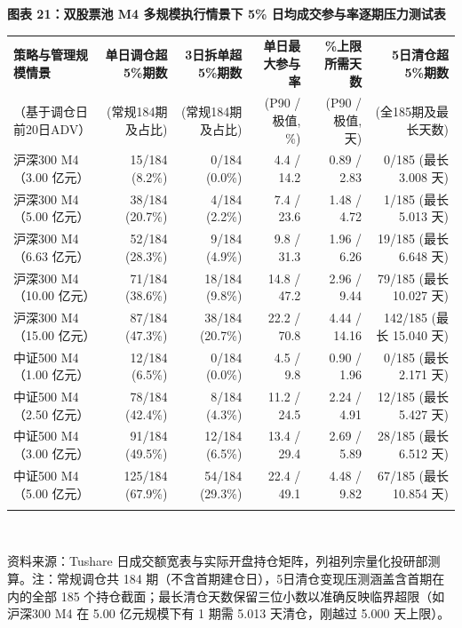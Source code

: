 \documentclass[12pt,a4paper]{article}
\newcommand{\exhibitcap}[1]{{\sffamily\bfseries\fontsize{9.6pt}{12.5pt}\selectfont\textcolor{Primary}{#1}}\\[2pt]}
\newcommand{\exhibitnote}[1]{{\fontsize{7.5pt}{10pt}\selectfont\color{GrayNote}#1\par}}
\begin{document}
\vspace{4pt}
\noindent\begin{minipage}{\textwidth}
\setlength{\parindent}{0pt}\setlength{\tabcolsep}{3.4pt}
\exhibitcap{图表 21：双股票池 M4 多规模执行情景下 5\% 日均成交参与率逐期压力测试表}
\fontsize{7.6pt}{10.3pt}\selectfont
\begin{tabularx}{\textwidth}{@{}X r r r r r@{}}
  \arrayrulecolor{Primary}\toprule[1.0pt]
  \rowcolor{TblHdr}
  \textbf{\sffamily 策略与管理规模情景} & \textbf{\sffamily 单日调仓超5\%期数} & \textbf{\sffamily 3日拆单超5\%期数} & \textbf{\sffamily 单日最大参与率} & \textbf{\sffamily 5\%上限所需天数} & \textbf{\sffamily 5日清仓超5\%期数} \\
  \rowcolor{TblHdr}
  {\fontsize{6.4}{7.8}\selectfont\textcolor{GrayNote}{（基于调仓日前20日ADV）}} &
  {\fontsize{6.4}{7.8}\selectfont\textcolor{GrayNote}{(常规184期及占比)}} &
  {\fontsize{6.4}{7.8}\selectfont\textcolor{GrayNote}{(常规184期及占比)}} &
  {\fontsize{6.4}{7.8}\selectfont\textcolor{GrayNote}{(P90 / 极值, \%)}} &
  {\fontsize{6.4}{7.8}\selectfont\textcolor{GrayNote}{(P90 / 极值, 天)}} &
  {\fontsize{6.4}{7.8}\selectfont\textcolor{GrayNote}{(全185期及最长天数)}} \\
  \midrule[0.5pt]
    沪深300 M4（3.00 亿元） & 15/184 (8.2\%) & 0/184 (0.0\%) & 4.4 / 14.2 & 0.89 / 2.83 & 0/185 (最长 3.008 天) \\
    沪深300 M4（5.00 亿元） & 38/184 (20.7\%) & 4/184 (2.2\%) & 7.4 / 23.6 & 1.48 / 4.72 & 1/185 (最长 5.013 天) \\
    沪深300 M4（6.63 亿元） & 52/184 (28.3\%) & 9/184 (4.9\%) & 9.8 / 31.3 & 1.96 / 6.26 & 19/185 (最长 6.648 天) \\
    沪深300 M4（10.00 亿元） & 71/184 (38.6\%) & 18/184 (9.8\%) & 14.8 / 47.2 & 2.96 / 9.44 & 79/185 (最长 10.027 天) \\
    沪深300 M4（15.00 亿元） & 87/184 (47.3\%) & 38/184 (20.7\%) & 22.2 / 70.8 & 4.44 / 14.16 & 142/185 (最长 15.040 天) \\
    \arrayrulecolor{RuleMuted}\midrule[0.35pt]
    中证500 M4（1.00 亿元） & 12/184 (6.5\%) & 0/184 (0.0\%) & 4.5 / 9.8 & 0.90 / 1.96 & 0/185 (最长 2.171 天) \\
    中证500 M4（2.50 亿元） & 78/184 (42.4\%) & 8/184 (4.3\%) & 11.2 / 24.5 & 2.24 / 4.91 & 12/185 (最长 5.427 天) \\
    中证500 M4（3.00 亿元） & 91/184 (49.5\%) & 12/184 (6.5\%) & 13.4 / 29.4 & 2.69 / 5.89 & 28/185 (最长 6.512 天) \\
    中证500 M4（5.00 亿元） & 125/184 (67.9\%) & 54/184 (29.3\%) & 22.4 / 49.1 & 4.48 / 9.82 & 67/185 (最长 10.854 天) \\
  \arrayrulecolor{Primary}\bottomrule[1.0pt]
\end{tabularx}\\[3pt]
\exhibitnote{资料来源：Tushare 日成交额宽表与实际开盘持仓矩阵，列祖列宗量化投研部测算。注：常规调仓共 184 期（不含首期建仓日），5日清仓变现压测涵盖含首期在内的全部 185 个持仓截面；最长清仓天数保留三位小数以准确反映临界超限（如沪深300 M4 在 5.00 亿元规模下有 1 期需 5.013 天清仓，刚越过 5.000 天上限）。}
\end{minipage}
\vspace{5pt}
\end{document}
